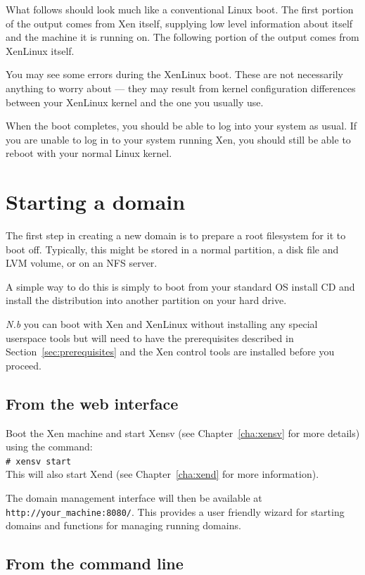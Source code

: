 \documentclass[11pt,twoside,final,openright]{xenstyle}
\begin{document}
What follows should look much like a conventional Linux boot.  The
first portion of the output comes from Xen itself, supplying low level
information about itself and the machine it is running on.  The
following portion of the output comes from XenLinux itself.

You may see some errors during the XenLinux boot.  These are not
necessarily anything to worry about --- they may result from kernel
configuration differences between your XenLinux kernel and the one you
usually use.

When the boot completes, you should be able to log into your system as
usual.  If you are unable to log in to your system running Xen, you
should still be able to reboot with your normal Linux kernel.


\chapter{Starting a domain}

The first step in creating a new domain is to prepare a root
filesystem for it to boot off.  Typically, this might be stored in a
normal partition, a disk file and LVM volume, or on an NFS server.

A simple way to do this is simply to boot from your standard OS
install CD and install the distribution into another partition on your
hard drive.

{\em N.b } you can boot with Xen and XenLinux without installing any
special userspace tools but will need to have the prerequisites
described in Section~\ref{sec:prerequisites} and the Xen control tools
are installed before you proceed.

\section{From the web interface}

Boot the Xen machine and start Xensv (see Chapter~\ref{cha:xensv} for
more details) using the command: \\
\verb_# xensv start_ \\
This will also start Xend (see Chapter~\ref{cha:xend} for more information).

The domain management interface will then be available at {\tt
http://your\_machine:8080/}.  This provides a user friendly wizard for
starting domains and functions for managing running domains.

\section{From the command line}
\end{document}
